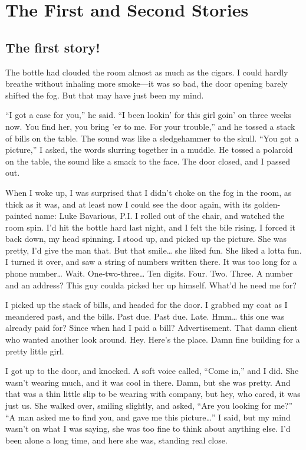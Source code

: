 \chapter{The First and Second Stories}


\section*{The first story!}



The bottle had clouded the room almost as much as the cigars. I
could hardly breathe without inhaling more smoke---it was so bad,
the door opening barely shifted the fog. But that may have just
been my mind.

``I got a case for you,'' he said. ``I been lookin' for this girl
goin' on three weeks now. You find her, you bring 'er to me. For
your trouble,'' and he tossed a stack of bills on the table. The
sound was like a sledgehammer to the skull. ``You got a picture,'' I
asked, the words slurring together in a muddle. He tossed a
polaroid on the table, the sound like a smack to the face. The door
closed, and I passed out.

When I woke up, I was surprised that I didn't choke on the fog in
the room, as thick as it was, and at least now I could see the door
again, with its golden-painted name: Luke Bavarious, P.I. I rolled
out of the chair, and watched the room spin. I'd hit the bottle
hard last night, and I felt the bile rising. I forced it back down,
my head spinning. I stood up, and picked up the picture. She was
pretty, I'd give the man that. But that smile{\ldots} she liked fun. She
liked a lotta fun. I turned it over, and saw a string of numbers
written there. It was too long for a phone number{\ldots} Wait.
One-two-three{\ldots} Ten digits. Four. Two. Three. A number and an
address? This guy coulda picked her up himself. What'd he need me
for?

I picked up the stack of bills, and headed for the door. I grabbed
my coat as I meandered past, and the bills. Past due. Past due.
Late. Hmm{\ldots} this one was already paid for? Since when had I paid a
bill? Advertisement. That damn client who wanted another look
around. Hey. Here's the place. Damn fine building for a pretty
little girl.

I got up to the door, and knocked. A soft voice called, ``Come in,''
and I did. She wasn't wearing much, and it was cool in there. Damn,
but she was pretty. And that was a thin little slip to be wearing
with company, but hey, who cared, it was just us. She walked over,
smiling slightly, and asked, ``Are you looking for me?'' ``A man asked
me to find you, and gave me this picture{\ldots}'' I said, but my mind
wasn't on what I was saying, she was too fine to think about
anything else. I'd been alone a long time, and here she was,
standing real close.


